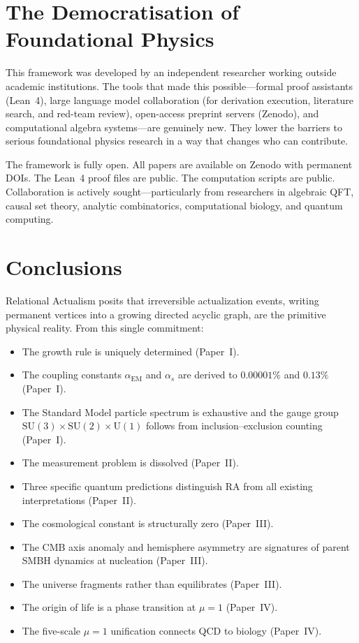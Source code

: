 \documentclass[11pt,a4paper]{article}
\theoremstyle{plain}
\theoremstyle{definition}
\theoremstyle{remark}
\begin{document}
\section{The Democratisation of Foundational Physics}\label{sec:demo}

This framework was developed by an independent researcher working outside
academic institutions.  The tools that made this possible---formal proof
assistants (Lean~4), large language model collaboration (for derivation
execution, literature search, and red-team review), open-access preprint servers
(Zenodo), and computational algebra systems---are genuinely new.  They lower the
barriers to serious foundational physics research in a way that changes who can
contribute.

The framework is fully open.  All papers are available on Zenodo with permanent
DOIs.  The Lean~4 proof files are public.  The computation scripts are public.
Collaboration is actively sought---particularly from researchers in algebraic
QFT, causal set theory, analytic combinatorics, computational biology, and
quantum computing.

\section{Conclusions}\label{sec:conclusions}

Relational Actualism posits that irreversible actualization events, writing
permanent vertices into a growing directed acyclic graph, are the primitive
physical reality.  From this single commitment:

\begin{itemize}[nosep]
\item The growth rule is uniquely determined (Paper~I).
\item The coupling constants $\alpha_{\mathrm{EM}}$ and $\alpha_s$ are derived
  to $0.00001\%$ and $0.13\%$ (Paper~I).
\item The Standard Model particle spectrum is exhaustive and the gauge group
  $\mathrm{SU}(3)\times\mathrm{SU}(2)\times\mathrm{U}(1)$ follows from
  inclusion--exclusion counting (Paper~I).
\item The measurement problem is dissolved (Paper~II).
\item Three specific quantum predictions distinguish RA from all existing
  interpretations (Paper~II).
\item The cosmological constant is structurally zero (Paper~III).
\item The CMB axis anomaly and hemisphere asymmetry are signatures of parent
  SMBH dynamics at nucleation (Paper~III).
\item The universe fragments rather than equilibrates (Paper~III).
\item The origin of life is a phase transition at $\mu = 1$ (Paper~IV).
\item The five-scale $\mu = 1$ unification connects QCD to biology (Paper~IV).
\end{itemize}
\end{document}
